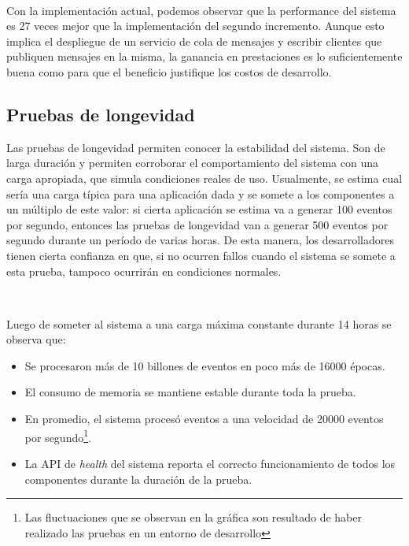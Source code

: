 \documentclass[a4paper,12pt, oneside]{article}
\begin{document}
\

Con la implementación actual, podemos observar que la performance del sistema es 27 veces mejor que la implementación del segundo incremento. Aunque esto implica el despliegue de un servicio de cola de mensajes y escribir clientes que publiquen mensajes en la misma, la ganancia en prestaciones es lo suficientemente buena como para que el beneficio justifique los costos de desarrollo.

\subsection{Pruebas de longevidad}
Las pruebas de longevidad permiten conocer la estabilidad del sistema. Son de larga duración y permiten corroborar el comportamiento del sistema con una carga apropiada, que simula condiciones reales de uso. Usualmente, se estima cual sería una carga típica para una aplicación dada y se somete a los componentes a un múltiplo de este valor: si cierta aplicación se estima va a generar 100 eventos por segundo, entonces las pruebas de longevidad van a generar 500 eventos por segundo durante un período de varias horas. De esta manera, los desarrolladores tienen cierta confianza en que, si no ocurren fallos cuando el sistema se somete a esta prueba, tampoco ocurrirán en condiciones normales.

\

Luego de someter al sistema a una carga máxima constante durante 14 horas se observa que:
\begin{itemize}
	\item Se procesaron más de 10 billones de eventos en poco más de 16000 épocas.
	\item El consumo de memoria se mantiene estable durante toda la prueba.
	\item En promedio, el sistema procesó eventos a una velocidad de 20000 eventos por segundo\footnote{Las fluctuaciones que se observan en la gráfica son resultado de haber realizado las pruebas en un entorno de desarrollo}.
	\item La API de \textit{health} del sistema reporta el correcto funcionamiento de todos los componentes durante la duración de la prueba.
\end{itemize}
\end{document}
